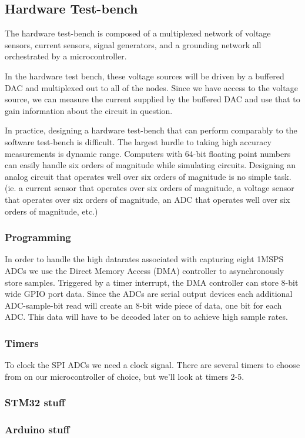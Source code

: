 \documentclass[11pt, a4paper]{article}
\begin{document}


\subsection{Hardware Test-bench}

The hardware test-bench is composed of a multiplexed network of voltage sensors, current sensors, signal generators, and a grounding network all orchestrated by a microcontroller.  

In the hardware test bench, these voltage sources will be driven by a buffered DAC and multiplexed out to all of the nodes.
Since we have access to the voltage source, we can measure the current supplied by the buffered DAC and use that to gain information about the circuit in question.

In practice, designing a hardware test-bench that can perform comparably to the software test-bench is difficult.
The largest hurdle to taking high accuracy measurements is dynamic range.
Computers with 64-bit floating point numbers can easily handle six orders of magnitude while simulating circuits.
Designing an analog circuit that operates well over six orders of magnitude is no simple task.
(ie. a current sensor that operates over six orders of magnitude, a voltage sensor that operates over six orders of magnitude, an ADC that operates well over six orders of magnitude, etc.)


\subsubsection{Programming}

In order to handle the high datarates associated with capturing eight 1MSPS ADCs we use the Direct Memory Access (DMA) controller to asynchronously store samples.
Triggered by a timer interrupt, the DMA controller can store 8-bit wide GPIO port data.
Since the ADCs are serial output devices each additional ADC-sample-bit read will create an 8-bit wide piece of data, one bit for each ADC.
This data will have to be decoded later on to achieve high sample rates.

\subsubsection{Timers}

To clock the SPI ADCs we need a clock signal.   
There are several timers to choose from on our microcontroller of choice, but we'll look at timers 2-5.

\subsubsection{STM32 stuff}

\subsubsection{Arduino stuff}
\begin{thebibliography}{1}
\end{thebibliography}
\end{document}
